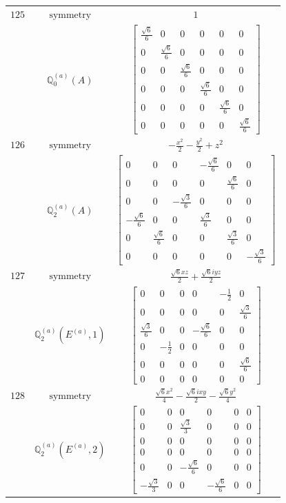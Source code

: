 \documentclass[fleqn,8pt,landscape]{jsarticle}
\begin{document}
\begin{longtable}{ccc}
$ 125 $ & $ \text{symmetry} $ & $ 1 $ \\
$  $ & $ \mathbb{Q}_{0}^{(a)}(A) $ & $ \begin{bmatrix} \frac{\sqrt{6}}{6} & 0 & 0 & 0 & 0 & 0 \\ 0 & \frac{\sqrt{6}}{6} & 0 & 0 & 0 & 0 \\ 0 & 0 & \frac{\sqrt{6}}{6} & 0 & 0 & 0 \\ 0 & 0 & 0 & \frac{\sqrt{6}}{6} & 0 & 0 \\ 0 & 0 & 0 & 0 & \frac{\sqrt{6}}{6} & 0 \\ 0 & 0 & 0 & 0 & 0 & \frac{\sqrt{6}}{6} \end{bmatrix} $ \\ \hline
$ 126 $ & $ \text{symmetry} $ & $ - \frac{x^{2}}{2} - \frac{y^{2}}{2} + z^{2} $ \\
$  $ & $ \mathbb{Q}_{2}^{(a)}(A) $ & $ \begin{bmatrix} 0 & 0 & 0 & - \frac{\sqrt{6}}{6} & 0 & 0 \\ 0 & 0 & 0 & 0 & \frac{\sqrt{6}}{6} & 0 \\ 0 & 0 & - \frac{\sqrt{3}}{6} & 0 & 0 & 0 \\ - \frac{\sqrt{6}}{6} & 0 & 0 & \frac{\sqrt{3}}{6} & 0 & 0 \\ 0 & \frac{\sqrt{6}}{6} & 0 & 0 & \frac{\sqrt{3}}{6} & 0 \\ 0 & 0 & 0 & 0 & 0 & - \frac{\sqrt{3}}{6} \end{bmatrix} $ \\ \hline
$ 127 $ & $ \text{symmetry} $ & $ \frac{\sqrt{6} x z}{2} + \frac{\sqrt{6} i y z}{2} $ \\
$  $ & $ \mathbb{Q}_{2}^{(a)}(E^{(a)},1) $ & $ \begin{bmatrix} 0 & 0 & 0 & 0 & - \frac{1}{2} & 0 \\ 0 & 0 & 0 & 0 & 0 & \frac{\sqrt{3}}{6} \\ \frac{\sqrt{3}}{6} & 0 & 0 & - \frac{\sqrt{6}}{6} & 0 & 0 \\ 0 & - \frac{1}{2} & 0 & 0 & 0 & 0 \\ 0 & 0 & 0 & 0 & 0 & \frac{\sqrt{6}}{6} \\ 0 & 0 & 0 & 0 & 0 & 0 \end{bmatrix} $ \\ \hline
$ 128 $ & $ \text{symmetry} $ & $ \frac{\sqrt{6} x^{2}}{4} - \frac{\sqrt{6} i x y}{2} - \frac{\sqrt{6} y^{2}}{4} $ \\
$  $ & $ \mathbb{Q}_{2}^{(a)}(E^{(a)},2) $ & $ \begin{bmatrix} 0 & 0 & 0 & 0 & 0 & 0 \\ 0 & 0 & \frac{\sqrt{3}}{3} & 0 & 0 & 0 \\ 0 & 0 & 0 & 0 & 0 & 0 \\ 0 & 0 & 0 & 0 & 0 & 0 \\ 0 & 0 & - \frac{\sqrt{6}}{6} & 0 & 0 & 0 \\ - \frac{\sqrt{3}}{3} & 0 & 0 & - \frac{\sqrt{6}}{6} & 0 & 0 \end{bmatrix} $ \\ \hline

\end{longtable}
\end{document}
